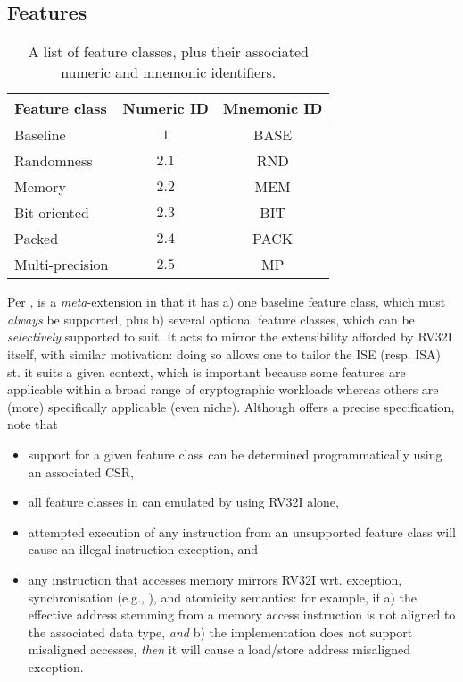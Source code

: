 
\subsection{Features}
\label{sec:bg:feature}

\begin{table}[t]
\begin{center}
\begin{tabular}{|l|cc|}
\hline
Feature class   & Numeric ID & Mnemonic ID \\
\hline
Baseline        & $1$        & BASE        \\
Randomness      & $2.1$      & RND         \\
Memory          & $2.2$      & MEM         \\
Bit-oriented    & $2.3$      & BIT         \\
Packed          & $2.4$      & PACK        \\
Multi-precision & $2.5$      & MP          \\
\hline
\end{tabular}
\end{center}
\caption{A list of feature classes, plus their associated numeric and mnemonic identifiers.}
\label{tab:feature}
\end{table}

Per , \XCID is a {\em meta}-extension in that it has 
a) one baseline feature class,
   which must {\em always} be supported,
   plus
b) several optional feature classes,
   which can be {\em selectively} supported to suit.
It acts to mirror the extensibility afforded by RV32I itself, with similar
motivation: doing so allows one to tailor the ISE (resp. ISA) st. it suits
a given context, which is important because some features are applicable 
within a broad range of cryptographic workloads whereas others are (more) 
specifically applicable (even niche).  Although  offers a 
precise specification, note that

\begin{itemize}
\item support for a given feature class can be determined programmatically 
      using an associated CSR,
\item all feature classes in \XCID can emulated by using RV32I alone,
\item attempted execution of any instruction from an unsupported feature 
      class will cause an 
      illegal instruction exception,
      and
\item any instruction that accesses memory mirrors RV32I wrt. exception,
      synchronisation (e.g., ), and atomicity semantics: 
      for example, if
      a) the effective address stemming from a memory access instruction
         is not aligned to the associated data type, 
         {\em  and}
      b) the implementation does not support misaligned accesses,
         {\em then}
         it will cause a 
         load/store address misaligned exception.
\end{itemize}

